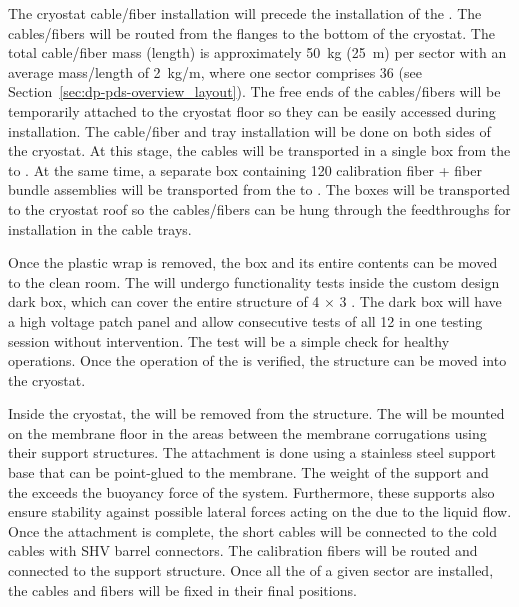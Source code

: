 The cryostat cable/fiber installation will precede the installation of the . The cables/fibers will be routed from the flanges to the bottom of the cryostat. The total cable/fiber mass (length) is approximately \SI{50}{\kg} (\SI{25}{\m}) per sector with an average mass/length of \SI{2}{\kg/\m}, where one sector comprises \num{36}  (see Section~\ref{sec:dp-pds-overview_layout}). The free ends of the cables/fibers will be temporarily attached to the cryostat floor so they can be easily accessed during installation. The cable/fiber and tray installation will be done on both sides of the cryostat. At this stage, the  cables will be transported in a single box from the  to \surf. At the same time, a separate box containing \num{120} calibration fiber + fiber bundle assemblies will be transported from the  to \surf. The boxes will be transported to the cryostat roof so the cables/fibers can be hung through the feedthroughs for installation in the cable trays.  

Once the plastic wrap is removed, the   box and its entire contents can be moved to the clean room. The  will undergo functionality tests inside the custom design dark box, which can cover the entire structure of \num{4} $\times$ \num{3} . The dark box will have a high voltage patch panel and allow consecutive tests of all \num{12}  in one testing session without intervention. The test will be a simple check for healthy  operations. Once the operation of the  is verified, the structure can be moved into the cryostat.

Inside the cryostat, the  will be removed from the structure. %
The  will be mounted on the membrane floor in the areas between the membrane corrugations using their support structures. The attachment is done using a stainless steel support base that can be point-glued to the membrane. The weight of the support and the  exceeds the buoyancy force of the system. Furthermore, these supports also ensure stability against possible lateral forces acting on the  due to the liquid flow. Once the attachment is complete, the short  cables will be connected to the cold  cables with SHV barrel connectors. The calibration fibers will be routed and connected to the support structure. Once all the  of a given  sector are installed, the cables and fibers will be fixed in their final positions.

